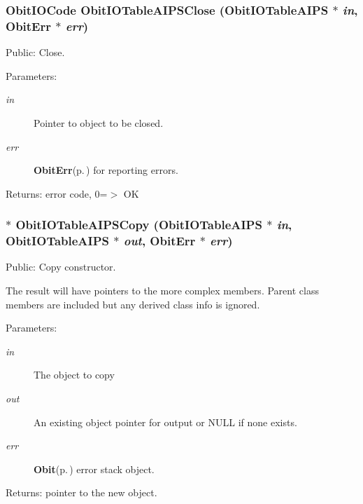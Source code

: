 \subsubsection{\setlength{\rightskip}{0pt plus 5cm}Obit\-IOCode Obit\-IOTable\-AIPSClose ({\bf Obit\-IOTable\-AIPS} $\ast$ {\em in}, {\bf Obit\-Err} $\ast$ {\em err})}\label{ObitIOTableAIPS_8c_a15}


Public: Close. 

\begin{Desc}
\item[Parameters:]
\begin{description}
\item[{\em in}]Pointer to object to be closed. \item[{\em err}]{\bf Obit\-Err}{\rm (p.\,\pageref{structObitErr})} for reporting errors. \end{description}
\end{Desc}
\begin{Desc}
\item[Returns:]error code, 0=$>$ OK \end{Desc}
\subsubsection{$\ast$ Obit\-IOTable\-AIPSCopy ({\bf Obit\-IOTable\-AIPS} $\ast$ {\em in}, {\bf Obit\-IOTable\-AIPS} $\ast$ {\em out}, {\bf Obit\-Err} $\ast$ {\em err})}\label{ObitIOTableAIPS_8c_a13}


Public: Copy constructor. 

The result will have pointers to the more complex members. Parent class members are included but any derived class info is ignored. \begin{Desc}
\item[Parameters:]
\begin{description}
\item[{\em in}]The object to copy \item[{\em out}]An existing object pointer for output or NULL if none exists. \item[{\em err}]{\bf Obit}{\rm (p.\,\pageref{structObit})} error stack object. \end{description}
\end{Desc}
\begin{Desc}
\item[Returns:]pointer to the new object. \end{Desc}
